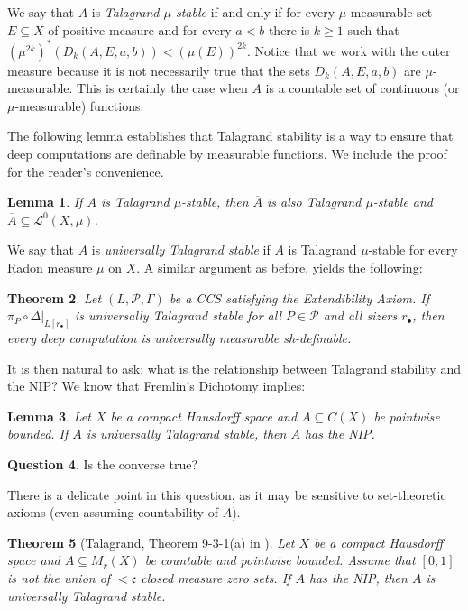 \documentclass[psamsfonts]{amsart}
\newtheorem{thm}{Theorem}[section]
\newtheorem{lem}[thm]{Lemma}
\theoremstyle{definition}
\newtheorem{question}[thm]{Question}
\theoremstyle{remark}
\numberwithin{equation}{section}
\begin{document}
We say that $A$ is \emph{Talagrand $\mu$-stable} if and only if for every $\mu$-measurable set $E\subseteq X$ of positive measure and for every $a<b$ there is $k\geq 1$ such that $(\mu^{2k})^*(D_k(A,E,a,b))<(\mu(E))^{2k}$. Notice that we work with the outer measure because it is not necessarily true that the sets $D_k(A,E,a,b)$ are $\mu$-measurable. This is certainly the case when $A$ is a countable set of continuous (or $\mu$-measurable) functions. 

The following lemma establishes that Talagrand stability is a way to ensure that deep computations are definable by measurable functions. We include the proof for the reader's convenience.

\begin{lem}
    If $A$ is Talagrand $\mu$-stable, then $\overline{A}$ is also Talagrand $\mu$-stable and $\overline{A}\subseteq\mathcal{L}^0(X,\mu)$.
\end{lem}

We say that $A$ is \emph{universally Talagrand stable} if $A$ is Talagrand $\mu$-stable for every Radon measure $\mu$ on $X$. A similar argument as before, yields the following:

\begin{thm}
    Let $(L,\mathcal P,\Gamma)$ be a CCS satisfying the Extendibility Axiom. If $\pi_P\circ\Delta|_{L[r_\bullet]}$ is universally Talagrand stable for all $P\in\mathcal{P}$ and all sizers $r_{\bullet}$, then every deep computation is universally measurable sh-definable.
\end{thm}

It is then natural to ask: what is the relationship between Talagrand stability and the NIP? We know that Fremlin's Dichotomy implies:

\begin{lem}
    Let $X$ be a compact Hausdorff space and $A\subseteq C(X)$ be pointwise bounded. If $A$ is universally Talagrand stable, then $A$ has the NIP.
\end{lem}

\begin{question}
    Is the converse true?
\end{question}

There is a delicate point in this question, as it may be sensitive to set-theoretic axioms (even assuming countability of $A$).

\begin{thm}[Talagrand, Theorem 9-3-1(a) in \cite{talagrand1984pettis}]
    Let $X$ be a compact Hausdorff space and $A\subseteq M_r(X)$ be countable and pointwise bounded. Assume that $[0,1]$ is not the union of $<\mathfrak{c}$ closed measure zero sets. If $A$ has the NIP, then $A$ is universally Talagrand stable.
\end{thm}
\end{document}
